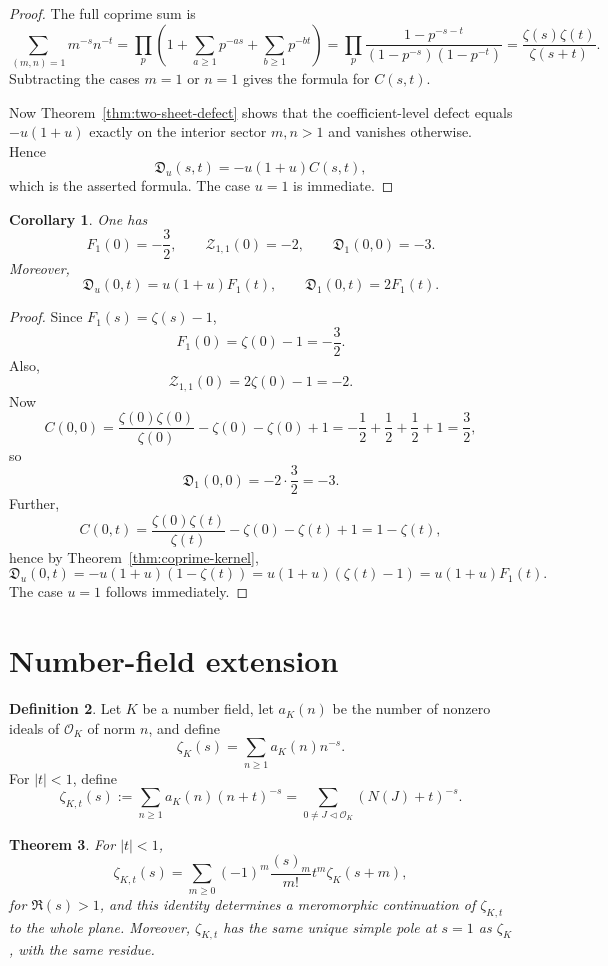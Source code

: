 \documentclass[11pt]{amsart}
\numberwithin{equation}{section}
\newtheorem{theorem}{Theorem}[section]
\newtheorem{corollary}[theorem]{Corollary}
\theoremstyle{definition}
\newtheorem{definition}[theorem]{Definition}
\newcommand{\cO}{\mathcal O}
\begin{document}
\begin{proof}
The full coprime sum is
\[
\sum_{(m,n)=1}m^{-s}n^{-t}
=
\prod_p\left(1+\sum_{a\ge1}p^{-as}+\sum_{b\ge1}p^{-bt}\right)
=
\prod_p\frac{1-p^{-s-t}}{(1-p^{-s})(1-p^{-t})}
=
\frac{\zeta(s)\zeta(t)}{\zeta(s+t)}.
\]
Subtracting the cases $m=1$ or $n=1$ gives the formula for $C(s,t)$.

Now Theorem~\ref{thm:two-sheet-defect} shows that the coefficient-level defect equals $-u(1+u)$ exactly on the interior sector $m,n>1$ and vanishes otherwise. Hence
\[
\mathfrak D_u(s,t)=-u(1+u)C(s,t),
\]
which is the asserted formula. The case $u=1$ is immediate. 
\end{proof}

\begin{corollary}\label{cor:origin-values}
One has
\[
F_1(0)=-\frac32,
\qquad
\mathcal Z_{1,1}(0)=-2,
\qquad
\mathfrak D_1(0,0)=-3.
\]
Moreover,
\[
\mathfrak D_u(0,t)=u(1+u)F_1(t),
\qquad
\mathfrak D_1(0,t)=2F_1(t).
\]
\end{corollary}

\begin{proof}
Since $F_1(s)=\zeta(s)-1$,
\[
F_1(0)=\zeta(0)-1=-\frac32.
\]
Also,
\[
\mathcal Z_{1,1}(0)=2\zeta(0)-1=-2.
\]
Now
\[
C(0,0)=\frac{\zeta(0)\zeta(0)}{\zeta(0)}-\zeta(0)-\zeta(0)+1
=-\frac12+\frac12+\frac12+1
=\frac32,
\]
so
\[
\mathfrak D_1(0,0)=-2\cdot\frac32=-3.
\]
Further,
\[
C(0,t)=\frac{\zeta(0)\zeta(t)}{\zeta(t)}-\zeta(0)-\zeta(t)+1=1-\zeta(t),
\]
hence by Theorem~\ref{thm:coprime-kernel},
\[
\mathfrak D_u(0,t)=-u(1+u)(1-\zeta(t))=u(1+u)(\zeta(t)-1)=u(1+u)F_1(t).
\]
The case $u=1$ follows immediately. 
\end{proof}

\section{Number-field extension}

\begin{definition}\label{def:number-field-shift}
Let $K$ be a number field, let $a_K(n)$ be the number of nonzero ideals of $\cO_K$ of norm $n$, and define
\[
\zeta_K(s)=\sum_{n\ge1}a_K(n)n^{-s}.
\]
For $|t|<1$, define
\[
\zeta_{K,t}(s):=\sum_{n\ge1}a_K(n)(n+t)^{-s}
=
\sum_{0\neq J\triangleleft \cO_K}(N(J)+t)^{-s}.
\]
\end{definition}

\begin{theorem}\label{thm:number-field-deformation}
For $|t|<1$,
\[
\zeta_{K,t}(s)=\sum_{m\ge0}(-1)^m\frac{(s)_m}{m!}t^m\zeta_K(s+m),
\]
for $\Re(s)>1$, and this identity determines a meromorphic continuation of $\zeta_{K,t}$ to the whole plane. Moreover, $\zeta_{K,t}$ has the same unique simple pole at $s=1$ as $\zeta_K$, with the same residue.
\end{theorem}
\end{document}
